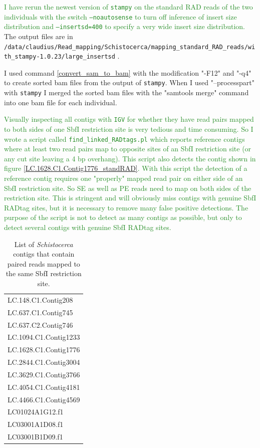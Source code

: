 \documentclass{article}\usepackage[]{graphicx}\usepackage[]{color}
\newcommand{\roger}[1]{ \textcolor[named]{ForestGreen}{#1} }
\begin{document}
\roger{I have rerun the newest version of \texttt{stampy} on the standard RAD reads of the two individuals with the switch \texttt{--noautosense} to turn off inference of insert size distribution and \texttt{--insertsd=400} to specify a very wide insert size distribution.} The output files are in \\{\scriptsize{ \texttt{/data/claudius/Read\_mapping/Schistocerca/mapping\_standard\_RAD\_reads/with\_stampy-1.0.23/large\_insertsd} }}.

I used command \ref{convert_sam_to_bam} with the modification "-F12" and "-q4" to create sorted bam files from the output of \texttt{stampy}. When I used "--processpart" with \texttt{stampy} I merged the sorted bam files with the "samtools merge" command into one bam file for each individual.

\roger{Visually inspecting all contigs with \texttt{IGV} for whether they have read pairs mapped to both sides of one SbfI restriction site is very tedious and time consuming. So I wrote a script called \texttt{find\_linked\_RADtags.pl} which reports reference contigs where at least two read pairs map to opposite sites of an SbfI restriction site (or any cut site leaving a 4 bp overhang). This script also detects the contig shown in figure \ref{LC.1628.C1.Contig1776_standRAD}. With this script the detection of a reference contig requires one "properly" mapped read pair on either side of an SbfI restriction site. So SE as well as PE reads need to map on both sides of the restriction site. This is stringent and will obviously miss contigs with genuine SbfI RADtag sites, but it is necessary to remove many false positive detections. The purpose of the script is not to detect as many contigs as possible, but only to detect several contigs with genuine SbfI RADtag sites.}

\begin{table}
\centering
\caption{List of \textit{Schistocerca} contigs that contain paired reads mapped to the same SbfI restriction site.}
\begin{tabular}{l}
\toprule
LC.148.C1.Contig208 \\
LC.637.C1.Contig745 \\
LC.637.C2.Contig746 \\
LC.1094.C1.Contig1233 \\
LC.1628.C1.Contig1776 \\
LC.2844.C1.Contig3004 \\
LC.3629.C1.Contig3766 \\
LC.4054.C1.Contig4181 \\
LC.4466.C1.Contig4569 \\
LC01024A1G12.f1 \\
LC03001A1D08.f1 \\
LC03001B1D09.f1 \\
\bottomrule
\end{tabular}
\label{linked_RADtag_contigs}
\end{table}
\end{document}
